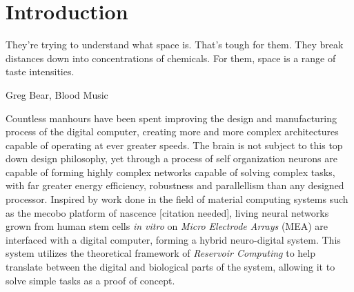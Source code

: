 \chapter{Introduction}
\epigraph{They're trying to understand what space is. That's tough for them.
They break distances down into concentrations of chemicals. For them, space is a
range of taste intensities.}{Greg Bear, Blood Music}
%
Countless manhours have been spent improving the design and manufacturing
process of the digital computer, creating more and more complex architectures
capable of operating at ever greater speeds.
%
The brain is not subject to this top down design philosophy, yet through a
process of self organization neurons are capable of forming highly complex
networks capable of solving complex tasks, with far greater energy efficiency,
robustness and parallellism than any designed processor.
%
Inspired by work done in the field of material computing systems such as the
mecobo platform of nascence [citation needed], living neural networks grown from
human stem cells \emph{in vitro} on \emph{Micro Electrode Arrays} (MEA) are interfaced
with a digital computer, forming a hybrid neuro-digital system.
%
This system utilizes the theoretical framework of \emph{Reservoir Computing} to
help translate between the digital and biological parts of the system, allowing
it to solve simple tasks as a proof of concept.\\ \\
